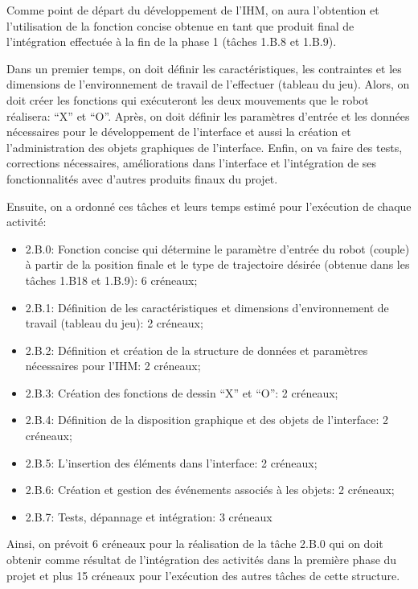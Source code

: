 
Comme point de départ du développement de l’IHM, on aura l’obtention et l’utilisation de la fonction concise obtenue en tant que produit final de l’intégration effectuée à la fin de la phase 1 (tâches 1.B.8 et 1.B.9).

Dans un premier temps, on doit définir les caractéristiques, les contraintes et  les dimensions de l’environnement de travail de l’effectuer (tableau du jeu). Alors, on doit créer les fonctions qui exécuteront les deux mouvements que le robot réalisera: “X” et “O”. Après, on doit définir les paramètres d’entrée et les données nécessaires pour le développement de l’interface et aussi la création et l’administration des objets graphiques de l’interface. Enfin, on va faire des tests, corrections nécessaires, améliorations dans l’interface et l’intégration de ses fonctionnalités avec d'autres produits finaux du projet. 

Ensuite, on a ordonné ces tâches et leurs temps estimé pour l'exécution de chaque activité:
\begin{itemize}

\item	2.B.0: Fonction concise qui détermine le paramètre d’entrée du robot (couple) à partir de la position finale et le type de trajectoire désirée (obtenue dans les tâches 1.B18 et 1.B.9): 6 créneaux; 
\item	2.B.1: Définition de les caractéristiques et dimensions d’environnement de travail (tableau du jeu): 2 créneaux;
\item	2.B.2: Définition et création de la structure de données et paramètres nécessaires pour l’IHM: 2 créneaux;
\item	2.B.3: Création des fonctions de dessin “X” et “O”: 2 créneaux;
\item	2.B.4: Définition de la disposition graphique et des objets de l’interface: 2 créneaux;
\item	2.B.5: L’insertion des éléments dans l’interface: 2 créneaux;
\item	2.B.6: Création et gestion des événements associés à les objets: 2 créneaux;
\item	2.B.7: Tests, dépannage et intégration: 3 créneaux

\end{itemize}

Ainsi, on prévoit 6 créneaux pour la réalisation de la tâche 2.B.0 qui on doit obtenir comme résultat de l’intégration des activités dans la première phase du projet et plus 15 créneaux pour l’exécution des autres tâches de cette structure.

